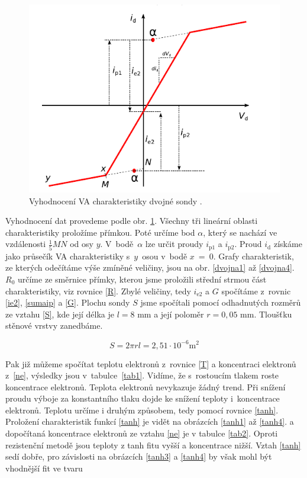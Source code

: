 \documentclass[a4paper,12pt]{article}
\begin{document}
\begin{figure}[h]
	\centering
	\includegraphics[width=130mm]{VAmerenidvojna.png}
	\caption{Vyhodnocení VA charakteristiky dvojné sondy \cite{navod}.}
	\label{VAmerenidvojna}
\end{figure}
Vyhodnocení dat provedeme podle obr. \ref{VAmerenidvojna}.
Všechny tři lineární oblasti charakteristiky proložíme přímkou.
Poté určíme bod $\alpha$, který se nachází ve vzdálenosti
$\frac{1}{5}MN$ od osy $y$. V~bodě~$\alpha$ lze určit proudy
$i_\text{{p1}}$ a $i_\text{{p2}}$. Proud $i_\text{{d}}$
získáme jako průsečík VA charakteristiky s~$y$~osou v~bodě
$x$~=~0. Grafy charakteristik, ze kterých odečítáme výše
zmíněné veličiny, jsou na obr. \ref{dvojna1} až \ref{dvojna4}.
$R_0$ určíme ze směrnice přímky, kterou jsme proložili
střední strmou část charakteristiky, viz rovnice \eqref{R}.
Zbylé veličiny, tedy $i_\text{{e2}}$ a $G$ spočítáme z~rovnic
\eqref{ie2}, \eqref{sumaip} a \eqref{G}. Plochu sondy $S$
jsme spočítali pomocí odhadnutých rozměrů ze vztahu \eqref{S},
kde její délka je $l = 8$ \si{\milli\meter} a její poloměr
$r = 0,05$ \si{\milli\meter}. Tloušťku stěnové
vrstvy zanedbáme.

\begin{equation}
	S = 2 \pi r l = 2,51\cdot 10^{-6} \si{\meter\squared}
	\label{S}
\end{equation}

Pak již můžeme
spočítat teplotu elektronů z~rovnice \eqref{T} a koncentraci
elektronů z~\eqref{ne}, výsledky jsou v~tabulce~\ref{tab1}.
Vidíme, že s~rostoucím tlakem roste koncentrace elektronů.
Teplota elektronů nevykazuje žádný trend. Při snížení proudu
výboje za konstantního tlaku dojde ke snížení teploty i~koncentrace
elektronů.
\newpage
Teplotu určíme i druhým způsobem, tedy pomocí rovnice
\eqref{tanh}. Proložení charakteristik funkcí \eqref{tanh}
je vidět na obrázcích \ref{tanh1} až \ref{tanh4}.
a dopočítaná koncentrace elektronů ze vztahu \eqref{ne}
je v tabulce \ref{tab2}. Oproti rezistenční metodě jsou
teploty z tanh fitu vyšší a koncentrace nižší. Vztah
\eqref{tanh} sedí dobře, pro závislosti na obrázcích
\ref{tanh3} a \ref{tanh4}
by však mohl být vhodnější fit ve tvaru
\end{document}
